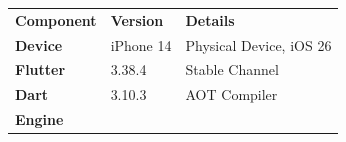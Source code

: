 \documentclass[
]{article}
\newcounter{none} %
\begin{document}
{\def\LTcaptype{none} %
\begin{longtable}[]{@{}
  >{\raggedright\arraybackslash}p{}
  >{\raggedright\arraybackslash}p{}
  >{\raggedright\arraybackslash}p{}@{}}
\toprule\noalign{}
\begin{minipage}[b]{\linewidth}\raggedright
\textbf{Component}
\end{minipage} & \begin{minipage}[b]{\linewidth}\raggedright
\textbf{Version}
\end{minipage} & \begin{minipage}[b]{\linewidth}\raggedright
\textbf{Details}
\end{minipage} \\
\begin{minipage}[b]{\linewidth}\raggedright
\textbf{Device}
\end{minipage} & \begin{minipage}[b]{\linewidth}\raggedright
iPhone 14
\end{minipage} & \begin{minipage}[b]{\linewidth}\raggedright
Physical Device, iOS 26
\end{minipage} \\
\begin{minipage}[b]{\linewidth}\raggedright
\textbf{Flutter}
\end{minipage} & \begin{minipage}[b]{\linewidth}\raggedright
3.38.4
\end{minipage} & \begin{minipage}[b]{\linewidth}\raggedright
Stable Channel
\end{minipage} \\
\begin{minipage}[b]{\linewidth}\raggedright
\textbf{Dart}
\end{minipage} & \begin{minipage}[b]{\linewidth}\raggedright
3.10.3
\end{minipage} & \begin{minipage}[b]{\linewidth}\raggedright
AOT Compiler
\end{minipage} \\
\begin{minipage}[b]{\linewidth}\raggedright
\textbf{Engine}
\end{minipage} & \begin{minipage}[b]{\linewidth}\raggedright

\end{minipage}
\end{longtable}}
\end{document}
